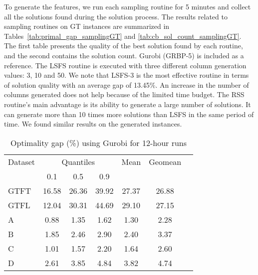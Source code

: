 \documentclass[3p, authoryear, times, doubleblind]{elsarticle}
\begin{document}
{To generate the features, we run each sampling routine for 5 minutes and collect all the solutions found during the solution process. The results related to sampling routines on GT instances are summarized in Tables~\ref{tab:primal_gap_samplingGT} and \ref{tab:cb_sol_count_samplingGT}. The first table presents the quality of the best solution found by each routine, and the second contains the solution count. Gurobi (GRBP-5) is included as a reference. The LSFS routine is executed with three different column generation values: 3, 10 and 50. We note that LSFS-3 is the most effective routine in terms of solution quality with an average gap of 13.45\%. An increase in the number of columns generated does not help because of the limited time budget. The RSS routine's main advantage is its ability to generate a large number of solutions. It can generate more than 10 times more solutions than LSFS in the same period of time. We found similar results on the generated instances. 




\begin{table}[h]
\centering
\caption{Optimality gap (\%) using Gurobi for 12-hour runs}
\label{tab:opt_gap_12h}
\begin{tabular}{lcccccc}
\toprule
{Dataset} & \multicolumn{3}{c}{Quantiles} & {Mean} & {Geomean} \\
{} & {0.1} & {0.5} & {0.9} & {} & {} \\
\midrule
GTFT & 16.58 & 26.36 & 39.92 & 27.37 & 26.88 \\
GTFL & 12.04 & 30.31 & 44.69 & 29.10 & 27.15 \\
A & 0.88 & 1.35 & 1.62 & 1.30 & 2.28 \\
B & 1.85 & 2.46 & 2.90 & 2.40 & 3.37 \\
C & 1.01 & 1.57 & 2.20 & 1.64 & 2.60 \\
D & 2.61 & 3.85 & 4.84 & 3.82 & 4.74 \\
\bottomrule
\end{tabular}
\end{table}


}
\end{document}
